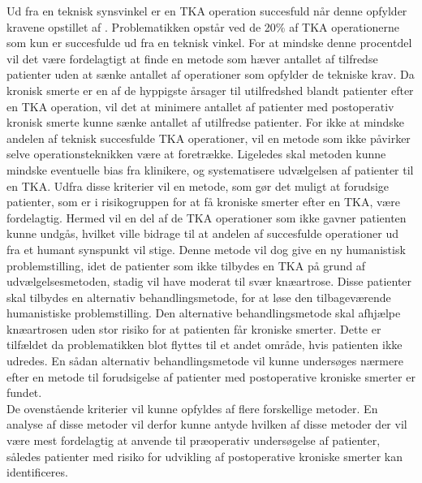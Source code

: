 Ud fra en teknisk synsvinkel er en TKA operation succesfuld når denne opfylder kravene opstillet af \cite{aarsrapport2016}. Problematikken opstår ved de 20\% af TKA operationerne som kun er succesfulde ud fra en teknisk vinkel. For at mindske denne procentdel vil det være fordelagtigt at finde en metode som hæver antallet af tilfredse patienter uden at sænke antallet af operationer som opfylder de tekniske krav. Da kronisk smerte er en af de hyppigste årsager til utilfredshed blandt patienter efter en TKA operation, vil det at minimere antallet af patienter med postoperativ kronisk smerte kunne sænke antallet af utilfredse patienter. \citep{Bourne2010} For ikke at mindske andelen af teknisk succesfulde TKA operationer, vil en metode som ikke påvirker selve operationsteknikken være at foretrække. Ligeledes skal metoden kunne mindske eventuelle bias fra klinikere, og systematisere udvælgelsen af patienter til en TKA. Udfra disse kriterier vil en metode, som gør det muligt at forudsige patienter, som er i risikogruppen for at få kroniske smerter efter en TKA, være fordelagtig. Hermed vil en del af de TKA operationer som ikke gavner patienten kunne undgås, hvilket ville bidrage til at andelen af succesfulde operationer ud fra et humant synspunkt vil stige. Denne metode vil dog give en ny humanistisk problemstilling, idet de patienter som ikke tilbydes en TKA på grund af udvælgelsesmetoden, stadig vil have moderat til svær knæartrose. Disse patienter skal tilbydes en alternativ behandlingsmetode, for at løse den tilbageværende humanistiske problemstilling. Den alternative behandlingsmetode skal afhjælpe knæartrosen uden stor risiko for at patienten får kroniske smerter. Dette er tilfældet da problematikken blot flyttes til et andet område, hvis patienten ikke udredes. En sådan alternativ behandlingsmetode vil kunne undersøges nærmere efter en metode til forudsigelse af patienter med postoperative kroniske smerter er fundet. \\  
De ovenstående kriterier vil kunne opfyldes af flere forskellige metoder. En analyse af disse metoder vil derfor kunne antyde hvilken af disse metoder der vil være mest fordelagtig at anvende til præoperativ undersøgelse af patienter, således patienter med risiko for udvikling af postoperative kroniske smerter kan identificeres.        

